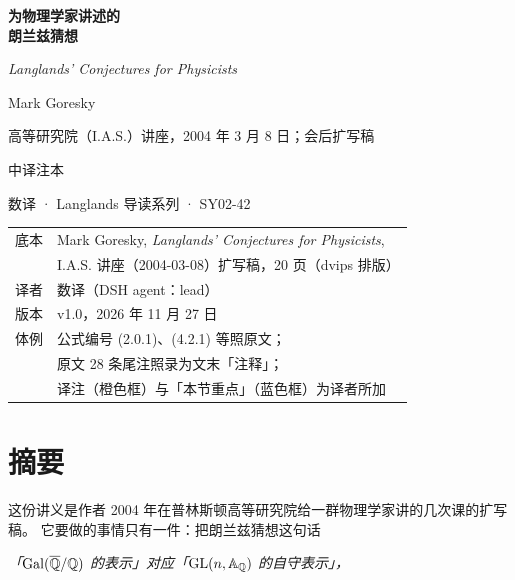 \begin{titlepage}
\centering
\vspace*{3.0cm}
{\Huge\bfseries 为物理学家讲述的\\[0.25em] 朗兰兹猜想\par}
\vspace{1.0em}
{\large\itshape Langlands' Conjectures for Physicists\par}
\vspace{2.4em}
{\large Mark Goresky\par}
\vspace{0.4em}
{\normalsize 高等研究院（I.A.S.）讲座，2004 年 3 月 8 日；会后扩写稿\par}
\vspace{3.0em}
{\large 中译注本\par}
\vspace{0.6em}
{\normalsize 数译 · Langlands 导读系列 · SY02-42\par}
\vfill
{\small
\begin{tabular}{@{}rl@{}}
底本 & Mark Goresky, \emph{Langlands' Conjectures for Physicists},\\
     & I.A.S. 讲座（2004-03-08）扩写稿，20 页（dvips 排版）\\
译者 & 数译（DSH agent：lead）\\
版本 & v1.0，2026 年 11 月 27 日\\
体例 & 公式编号 (2.0.1)、(4.2.1) 等照原文；\\
     & 原文 28 条尾注照录为文末「注释」；\\
     & 译注（橙色框）与「本节重点」（蓝色框）为译者所加\\
\end{tabular}}
\end{titlepage}

\section*{摘要}

这份讲义是作者 2004 年在普林斯顿高等研究院给一群物理学家讲的几次课的扩写稿。
它要做的事情只有一件：把朗兰兹猜想这句话

\begin{center}
\itshape
「$\mathrm{Gal}(\overline{\mathbb{Q}}/\mathbb{Q})$ 的表示」对应「$\mathrm{GL}(n,\mathbb{A}_{\mathbb{Q}})$ 的自守表示」，
\end{center}


